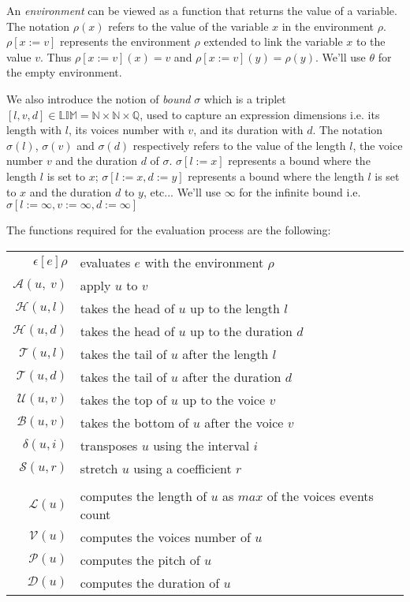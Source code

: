 \documentclass[10pt,a4paper,frenchb]{article}
\newcommand{\bounddomain}{\ensuremath{\mathbb{LIM}}}
\newcommand{\ebounddomain}{\ensuremath{\mathbb{N} \times \mathbb{N} \times \mathbb{Q}}}
\newcommand{\evalsym}			{\ensuremath{\epsilon}}
\newcommand{\envsym}				{\ensuremath{\rho}}
\newcommand{\emptyenv}			{\ensuremath{\theta}}
\newcommand{\applysym}			{\ensuremath{\mathcal A}}
\newcommand{\evalsimple}[2][\envsym]	{\ensuremath{\evalsym\left[#2\right]#1}}
\newcommand{\applysimple}[2]			{\ensuremath{\applysym\left(#1,\ #2\right)}}
\newcommand{\length}			{\ensuremath{\mathcal L}}
\newcommand{\voices}			{\ensuremath{\mathcal V}}
\newcommand{\pitch}			{\ensuremath{\mathcal P}}
\newcommand{\dur}			{\ensuremath{\mathcal D}}
\newcommand{\head}			{\ensuremath{\mathcal H}}
\newcommand{\tail}			{\ensuremath{\mathcal T}}
\renewcommand{\top}			{\ensuremath{\mathcal U}}
\newcommand{\bottom}			{\ensuremath{\mathcal B}}
\newcommand{\transp}			{\ensuremath{\delta}}
\renewcommand{\stretch}		{\ensuremath{\mathcal S}}
\newcommand{\bounds}			{\ensuremath{\sigma}}
\newcommand{\nobounds}		{\ensuremath{\infty}}
\begin{document}
An \emph{environment} can be viewed as a function that returns the value of a variable. The notation $\envsym(x)$ refers to the value of the variable $x$ in the environment $\envsym$. $\envsym[x := v]$ represents the environment $\envsym$ extended to link the variable $x$ to the value $v$. Thus $\envsym[x := v](x) = v$ and $\envsym[x := v](y) = \envsym(y)$. We'll use $\emptyenv $ for the empty environment.


We also introduce the notion of \emph{bound} $\bounds$ which is a triplet $[l, v, d] \in \bounddomain = \ebounddomain$, used to capture an expression dimensions i.e. its length with $l$, its voices number with $v$, and its duration with $d$. 
The notation $\bounds(l)$, $\bounds(v)$ and $\bounds(d)$ respectively refers to the value of the length $l$, the voice number $v$ and the duration $d$  of $\bounds$. $\bounds[l := x]$ represents a bound where the length $l$ is set to $x$; $\bounds[l := x, d:=y]$ represents a bound where the length $l$ is set to $x$ and the duration $d$ to $y$, etc... We'll use $\nobounds$ for the infinite bound i.e. $\bounds[l := \infty, v:= \infty, d:= \infty]$



The functions required for the evaluation process are the following:
\begin{center}
\begin{tabular}{rl}
 \hline
 $\evalsimple{e}$ 			& evaluates $e$ with the environment $\envsym$ \\
 $\applysimple{u}{v}$ 		& apply $u$ to $v$ \\
 $\head(u,l)$ 				& takes the head of $u$ up to the length $l$ \\
 $\head(u,d)$ 				& takes the head of $u$ up to the duration $d$ \\
 $\tail(u,l)$ 				& takes the tail of $u$ after the length $l$ \\
 $\tail(u,d)$ 				& takes the tail of $u$ after the duration $d$ \\
 $\top(u,v)$ 				& takes the top of $u$ up to the voice $v$ \\
 $\bottom(u,v)$ 				& takes the bottom of $u$ after the voice $v$ \\
 $\transp(u,i)$ 		   		& transposes $u$ using the interval $i$ \\
 $\stretch(u,r)$ 			& stretch $u$ using a coefficient $r$ \\
\multicolumn{2}{c}{\dotfill{}} \\
 $\length(u)$ 				& computes the length of $u$ as $max$ of the voices events count \\
 $\voices(u)$ 				& computes the voices number of $u$ \\
 $\pitch(u)$ 				& computes the pitch of $u$ \\
 $\dur(u)$ 					& computes the duration of $u$ \\
 \hline
\end{tabular}
\end{center}
\end{document}
